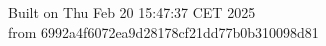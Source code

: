{\noindent Built on Thu Feb 20 15:47:37 CET 2025} \\ 
 {\noindent from 6992a4f6072ea9d28178cf21dd77b0b310098d81}
